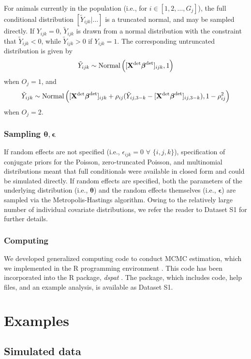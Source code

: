 \documentclass[10pt]{article}
\begin{document}
For animals currently in the population (i.e., for $i \in [1,2,\hdots,G_j]$), the full conditional distribution $[ \tilde{Y}_{ijk} | \hdots]$ is a truncated normal, and may be sampled directly.  If $Y_{ijk}=0$, $\tilde{Y}_{ijk}$ is drawn from a normal distribution with the constraint that $\tilde{Y}_{ijk}<0$, while $\tilde{Y}_{ijk}>0$ if $Y_{ijk}=1$.  The corresponding untruncated distribution is given by
$$
\tilde{Y}_{ijk} \sim \textrm{Normal} \left( [{\bf X}^{\rm det} \boldsymbol{\beta}^{\rm det}]_{ijk},1  \right)
$$
when $O_j=1$, and
$$
\tilde{Y}_{ijk} \sim \textrm{Normal} \left( [{\bf X}^{\rm det} \boldsymbol{\beta}^{\rm det}]_{ijk}+\rho_{ij}(\tilde{Y}_{ij,3-k}-[{\bf X}^{\rm det} \boldsymbol{\beta}^{\rm det}]_{ij,3-k}),1-\rho_{ij}^2  \right)
$$
when $O_j=2$.

\subsubsection*{Sampling $\boldsymbol{\theta}, \boldsymbol{\epsilon}$}

If random effects are not specified (i.e., $\epsilon_{ijk}=0$ $\forall$ $\{i,j,k\}$), specification of conjugate priors for the Poisson, zero-truncated Poisson, and multinomial distributions meant that full conditionals were available in closed form and could be simulated directly.  If random effects are specified, both the parameters of the underlying distribution (i.e., $\boldsymbol{\theta}$) and the random effects themselves (i.e., $\boldsymbol{\epsilon}$)
are sampled via the Metropolis-Hastings algorithm.  Owing to the relatively large number of individual covariate distributions, we refer the reader to Dataset S1 for further details.

\subsubsection*{Computing}

We developed generalized computing code to conduct MCMC estimation, which we implemented in the R programming environment \cite{RTeam2007}.  This code has been incorporated into the R package, \emph{dspat} \cite{JohnsonEtAl2010}.  The package, which includes code, help files, and an example analysis, is available as Dataset S1.

\section*{Examples}

\subsection*{Simulated data}
\end{document}
